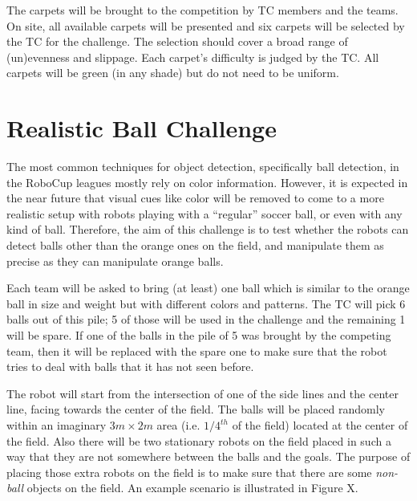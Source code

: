 \documentclass[12pt]{article}
\begin{document}
The carpets will be brought to the competition by TC members and the teams. On site, all available carpets will be presented and six carpets will be selected by the TC for the challenge. The selection should cover a broad range of (un)evenness and slippage. Each carpet's difficulty is judged by the TC. All carpets will be green (in any shade) but do not need to be uniform.


\newpage






\section{Realistic Ball Challenge}


The most common techniques for object detection, specifically ball detection, in the RoboCup leagues mostly rely on color information. However, it is expected in the near future that visual cues like color will be removed to come to a more realistic setup with robots playing with a ``regular'' soccer ball, or even with any kind of ball. Therefore, the aim of this challenge is to test whether the robots can detect balls other than the orange ones on the field, and manipulate them as precise as they can manipulate orange balls.

Each team will be asked to bring (at least) one ball which is similar to the orange ball in size and weight but with different colors and patterns. The TC will pick 6 balls out of this pile; 5 of those will be used in the challenge and the remaining 1 will be spare. If one of the balls in the pile of 5 was brought by the competing team, then it will be replaced with the spare one to make sure that the robot tries to deal with balls that it has not seen before.

The robot will start from the intersection of one of the side lines and the center line, facing towards the center of the field. The balls will be placed randomly within an imaginary $3m \times 2m$ area (i.e. $1/4^{th}$ of the field) located at the center of the field. Also there will be two stationary robots on the field placed in such a way that they are not somewhere between the balls and the goals. The purpose of placing those extra robots on the field is to make sure that there are some \emph{non-ball} objects on the field. An example scenario is illustrated in Figure X.
\end{document}
